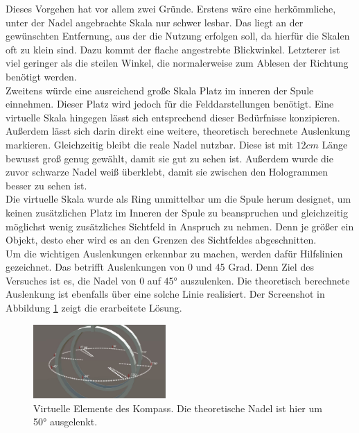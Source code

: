 Dieses Vorgehen hat vor allem zwei Gründe. Erstens wäre eine herkömmliche, unter der Nadel angebrachte Skala nur schwer lesbar. Das liegt an der gewünschten Entfernung, aus der die Nutzung erfolgen soll, da hierfür die Skalen oft zu klein sind. Dazu kommt der flache angestrebte Blickwinkel. Letzterer ist viel geringer als die steilen Winkel, die normalerweise zum Ablesen der Richtung benötigt werden.\\
\noindent\hspace*{5mm}
Zweitens würde eine ausreichend große Skala Platz im inneren der Spule einnehmen. Dieser Platz wird jedoch für die Felddarstellungen benötigt. Eine virtuelle Skala hingegen lässt sich entsprechend dieser Bedürfnisse konzipieren. Außerdem lässt sich darin direkt eine weitere, theoretisch berechnete Auslenkung markieren. Gleichzeitig bleibt die reale Nadel nutzbar. Diese ist mit $12 cm$ Länge bewusst groß genug gewählt, damit sie gut zu sehen ist. Außerdem wurde die zuvor schwarze Nadel weiß überklebt, damit sie zwischen den Hologrammen besser zu sehen ist.\\

Die virtuelle Skala wurde als Ring unmittelbar um die Spule herum designet, um keinen zusätzlichen Platz im Inneren der Spule zu beanspruchen und gleichzeitig möglichst wenig zusätzliches Sichtfeld in Anspruch zu nehmen. Denn je größer ein Objekt, desto eher wird es an den Grenzen des Sichtfeldes abgeschnitten.\\
\noindent\hspace*{5mm}
Um die wichtigen Auslenkungen erkennbar zu machen, werden dafür Hilfslinien gezeichnet. Das betrifft Auslenkungen von 0 und 45 Grad. Denn Ziel des Versuches ist es, die Nadel von 0 auf 45° auszulenken. Die theoretisch berechnete Auslenkung ist ebenfalls über eine solche Linie realisiert. Der Screenshot in Abbildung \ref{img:compass} zeigt die erarbeitete Lösung.

\begin{figure}[h!]
	\centering
	\includegraphics[width=0.45\textwidth]{images/unity/compass.jpg}
	\caption{Virtuelle Elemente des Kompass. Die theoretische Nadel ist hier um 50° ausgelenkt.}
	\label{img:compass}
\end{figure}

